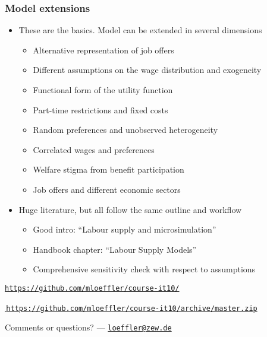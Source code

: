 \documentclass[handout,intlimits]{beamer}
\newcommand{\beginbackup}{
	\newcounter{framenumberpreappendix}
	\setcounter{framenumberpreappendix}{\value{framenumber}}
}
\def\litc#1{\textcolor{med-gray}{\tiny\citep{#1}}}
\def\blue#1{\textcolor{zewblue}{#1}}
\begin{document}
\begin{frame}
\frametitle{Model extensions}
\begin{itemize}
	\item \blue{These are the basics. Model can be extended in several dimensions}
	\begin{itemize}
		\item Alternative representation of job offers \litc{aaberge_etal_2009, dagsvik_etal_2014}
		\smallskip
		\item Different assumptions on the wage distribution and exogeneity \litc{loeffler_etal_2014}
		\smallskip
		\item Functional form of the utility function \litc{vansoest_etal_2002, loeffler_etal_2014}
		\smallskip
		\item Part-time restrictions and fixed costs \litc{vansoest_1995, euwals_vansoest_1999}
		\smallskip
		\item Random preferences and unobserved heterogeneity \litc{vansoest_1995, pacifico_2013}
		\smallskip
		\item Correlated wages and preferences \litc{breunig_etal_2008, blundell_shephard_2012}
		\smallskip
		\item Welfare stigma from benefit participation \litc{hoynes_1996, keane_moffitt_1998}
		\smallskip
		\item Job offers and different economic sectors \litc{dagsvik_strom_2006}
	\end{itemize}
	\bigskip
	\item \blue{Huge literature, but all follow the same outline and workflow}
	\begin{itemize}
		\item Good intro: ``Labour supply and microsimulation'' \litc{creedy_kalb_2005, creedy_kalb_2006}
		\smallskip
		\item Handbook chapter: ``Labour Supply Models'' \litc{aaberge_colombino_2014}
		\smallskip
		\item Comprehensive sensitivity check with respect to assumptions \litc{loeffler_etal_2014}
	\end{itemize}
\end{itemize}
\end{frame}


\beginbackup

\begin{frame}
\begin{center}
	\bigskip\bigskip
	\href{https://github.com/mloeffler/course-it10/}{\blue{\nolinkurl{https://github.com/mloeffler/course-it10/}}}

	\bigskip
	\href{https://github.com/mloeffler/course-it10/archive/master.zip}{\blue{\,\nolinkurl{https://github.com/mloeffler/course-it10/archive/master.zip}}}

	\bigskip\bigskip
	Comments or questions? --- \href{mailto:loeffler@zew.de}{\blue{\nolinkurl{loeffler@zew.de}}}
\end{center}
\end{frame}
\end{document}
